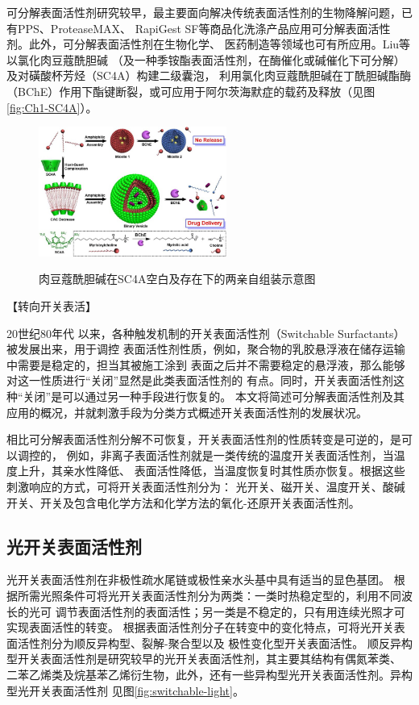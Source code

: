 \documentclass[bachelor,fandolfonts,replaceperiod]{jnuthesis} %
\begin{document}
    可分解表面活性剂研究较早，最主要面向解决传统表面活性剂的生物降解问题，已有PPS、ProteaseMAX、
    RapiGest SF等商品化洗涤产品应用可分解表面活性剂。此外，可分解表面活性剂在生物化学、
    医药制造等领域也可有所应用\cite{hellberg2000}。Liu等\cite{guo2012}以氯化肉豆蔻酰胆碱
    （及一种季铵酯表面活性剂，在酶催化或碱催化下可分解）及对磺酸杯芳烃（SC4A）构建二级囊泡，
    利用氯化肉豆蔻酰胆碱在丁酰胆碱酯酶（BChE）作用下酯键断裂，或可应用于阿尔茨海默症的载药及释放（见图\ref{fig:Ch1-SC4A}）。
    
    \begin{figure}[htbp]
        \centering
        \includegraphics[width= 0.55\textwidth]{Figure/Ch1-SC4A}\\
        \caption{肉豆蔻酰胆碱在SC4A空白及存在下的两亲自组装示意图}\label{fig:cleavale-SC4A}
    \end{figure}
    
   【转向开关表活】
    
    20世纪80年代
    以来，各种触发机制的开关表面活性剂（Switchable Surfactants）被发展出来，用于调控
    表面活性剂性质，例如，聚合物的乳胶悬浮液在储存运输中需要是稳定的，担当其被施工涂到
    表面之后并不需要稳定的悬浮液，那么能够对这一性质进行“关闭”显然是此类表面活性剂的
    有点\cite{jessop2012}。同时，开关表面活性剂这种“关闭”是可以通过另一种手段进行恢复的。
    本文将简述可分解表面活性剂及其应用的概况，并就刺激手段为分类方式概述开关表面活性剂的发展状况。
    
    相比可分解表面活性剂分解不可恢复，开关表面活性剂的性质转变是可逆的，是可以调控的，
    例如，非离子表面活性剂就是一类传统的温度开关表面活性剂，当温度上升，其亲水性降低、
    表面活性降低，当温度恢复时其性质亦恢复。根据这些刺激响应的方式，可将开关表面活性剂分为：
    光开关、磁开关、温度开关、酸碱开关、开关及包含电化学方法和化学方法的氧化-还原开关表面活性剂\cite{秦勇2009}。
    
    \subsection{光开关表面活性剂}
    光开关表面活性剂在非极性疏水尾链或极性亲水头基中具有适当的显色基团\cite{张冤帝2017}。
    根据所需光照条件可将光开关表面活性剂分为两类：一类时热稳定型的，利用不同波长的光可
    调节表面活性剂的表面活性；另一类是不稳定的，只有用连续光照才可实现表面活性的转变。
    根据表面活性剂分子在转变中的变化特点，可将光开关表面活性剂分为顺反异构型、裂解-聚合型以及
    极性变化型开关表面活性\cite{张冤帝2017,李云霞2011}。
    顺反异构型开关表面活性剂是研究较早的光开关表面活性剂，其主要其结构有偶氮苯类、
    二苯乙烯类及烷基苯乙烯衍生物，此外，还有一些异构型光开关表面活性剂。异构型光开关表面活性剂
    见图\ref{fig:switchable-light}\cite{张冤帝2017,karthaus1996,shang2003,吕湘亮2018}。
    
\end{document}
